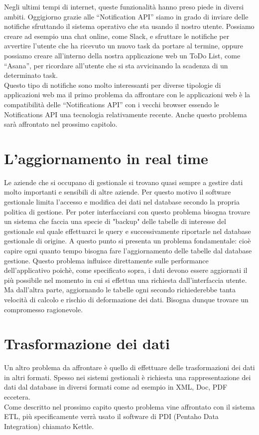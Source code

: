 Negli ultimi tempi di internet, queste funzionalità hanno preso piede in diversi ambiti. Oggigiorno grazie alle “Notification API” siamo in grado di inviare delle notifiche sfruttando il sistema operativo che sta usando il nostro utente. Possiamo creare ad esempio una chat online, come Slack, e sfruttare le notifiche per avvertire l'utente che ha ricevuto un nuovo task da portare al termine, oppure possiamo creare all'interno della nostra applicazione web un ToDo List, come “Asana”, per ricordare all'utente che si sta avvicinando la scadenza di un determinato task.\\
Questo tipo di notifiche sono molto interessanti per diverse tipologie di applicazioni web ma il primo problema da affrontare con le applicazioni web è la compatibilità delle “Notifications API”  con i vecchi  browser essendo le Notifications API una tecnologia relativamente recente. Anche questo problema sarà affrontato nel prossimo capitolo.


\section{L'aggiornamento in real time}
Le aziende che si occupano di gestionale si trovano quasi sempre a gestire dati molto importanti e sensibili di altre aziende. Per questo motivo il software gestionale limita l'accesso e modifica dei dati nel database secondo la propria politica di gestione. Per poter interfacciarsi con questo problema bisogna trovare un sistema che faccia una specie di "backup" delle tabelle di interesse del gestionale sul quale effettuarci le query e successivamente riportarle nel database gestionale di origine. A questo punto si presenta un problema fondamentale: cioè capire ogni quanto tempo bisogna fare l'aggiornamento delle tabelle dal database gestione. Questo problema influisce direttamente sulle performance dell'applicativo poichè, come specificato sopra, i dati devono essere aggiornati il più possibile nel momento in cui si effettua una richiesta dall'interfaccia utente. Ma dall'altra parte, aggiornando le tabelle ogni secondo richiederebbe tanta velocità di calcolo e rischio di deformazione dei dati. Bisogna dunque trovare un compromesso ragionevole. 

\section{Trasformazione dei dati}
Un altro problema da affrontare è quello di effettuare delle trasformazioni dei dati in altri formati. Spesso nei sistemi gestionali è richiesta una rappresentazione dei dati dal database in diversi formati come ad esempio in XML, Doc, PDF eccetera.  \\
Come descritto nel prossimo capito questo problema vine affrontato con il sistema ETL, più specificamente verrà usato il software di PDI (Pentaho Data Integration) chiamato Kettle.


